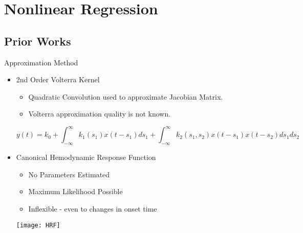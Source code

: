 \section{Nonlinear Regression}
\subsection{Prior Works}
\begin{frame}{Approximation Method}
  \begin{itemize}
    \item 2nd Order Volterra Kernel \cite{Friston2000}
    \begin{itemize}
        \item Quadratic Convolution used to approximate Jacobian Matrix.
        \item Volterra approximation quality is not known.
    \end{itemize}
    {\footnotesize
    $$y(t) = k_0 + \int_{-\infty}^{\infty} k_1(s_1) x(t-s_1) ds_1
        + \int_{-\infty}^{\infty} k_2(s_1,s_2) x(t-s_1)x(t-s_2) ds_1 ds_2$$
    }
    \item Canonical Hemodynamic Response Function
    \begin{itemize}
        \item No Parameters Estimated
        \item Maximum Likelihood Possible
        \item Inflexible - even to changes in onset time
    \end{itemize}
    \begin{center}
    \texttt{[image: HRF]}
    \end{center}
    
  \end{itemize}
\end{frame}

